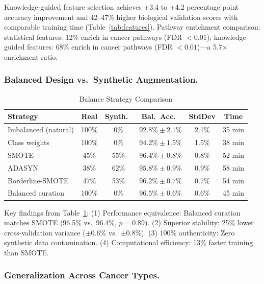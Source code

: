 \documentclass[manuscript, screen, review]{jair}
\begin{document}
Knowledge-guided feature selection achieves +3.4 to +4.2 percentage point accuracy improvement and 42--47\% higher biological validation scores with comparable training time (Table~\ref{tab:features}). Pathway enrichment comparison: statistical features: 12\% enrich in cancer pathways (FDR $< 0.01$); knowledge-guided features: 68\% enrich in cancer pathways (FDR $< 0.01$)---a 5.7$\times$ enrichment ratio.

\subsubsection{Balanced Design vs.\ Synthetic Augmentation.}

\begin{table}[!t]
  \caption{Balance Strategy Comparison}
  \label{tab:balance}
  \centering
  \small
  \begin{tabular}{lccccc}
    \toprule
    Strategy & Real & Synth.\ & Bal.\ Acc.\ & StdDev & Time \\
    \midrule
    Imbalanced (natural) & 100\% & 0\%  & $92.8\%\pm2.1\%$ & 2.1\% & 35 min \\
    Class weights        & 100\% & 0\%  & $94.2\%\pm1.5\%$ & 1.5\% & 38 min \\
    SMOTE                & 45\%  & 55\% & $96.4\%\pm0.8\%$ & 0.8\% & 52 min \\
    ADASYN               & 38\%  & 62\% & $95.8\%\pm0.9\%$ & 0.9\% & 58 min \\
    Borderline-SMOTE     & 47\%  & 53\% & $96.2\%\pm0.7\%$ & 0.7\% & 54 min \\
    Balanced curation    & 100\% & 0\%  & $96.5\%\pm0.6\%$ & 0.6\% & 45 min \\
    \bottomrule
  \end{tabular}
\end{table}

Key findings from Table~\ref{tab:balance}: (1) Performance equivalence: Balanced curation matches SMOTE (96.5\% vs.\ 96.4\%, $p = 0.89$). (2) Superior stability: 25\% lower cross-validation variance ($\pm$0.6\% vs.\ $\pm$0.8\%). (3) 100\% authenticity: Zero synthetic data contamination. (4) Computational efficiency: 13\% faster training than SMOTE.

\subsubsection{Generalization Across Cancer Types.}
\label{sec:generalization}
\end{document}
